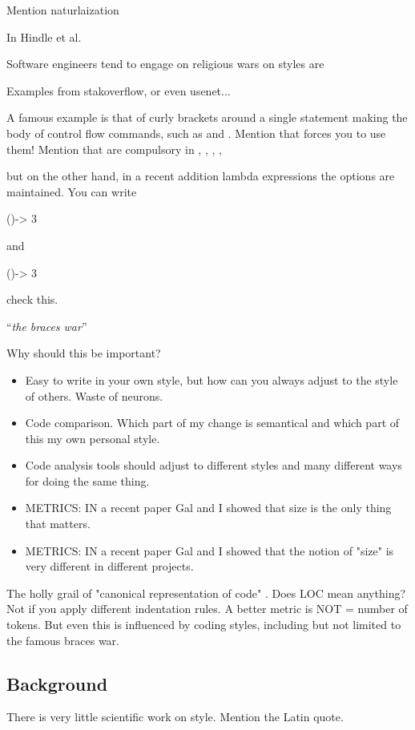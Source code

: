 Mention naturlaization

In Hindle et al. \cite{Hindle:Bar:Su:Gabel:Devanbu:2012}

\Java
Software engineers tend to engage  on religious wars on styles are

Examples from stakoverflow, or even usenet... 

A famous example is that of curly brackets around a single statement making
the body of control flow commands, such as  and 
.
Mention that \Go forces you to use them!
Mention that are compulsory in , 
,  
,  
,  

but on the other hand, in a recent addition lambda expressions\cite{lambda}
the options are maintained.
You can write
\begin{JAVA}
()-> 3
\end{JAVA}
and
\begin{JAVA}
  ()-> {3}
\end{JAVA}
check this.

``\emph{the braces war}''


Why should this be important?
\begin{itemize}
    \item Easy to write in  your own style, but how can 
      you always adjust to the style of others.
      Waste of neurons.
    \item Code comparison. Which part of my change is semantical and which 
      part of this my own personal style.
    \item Code analysis tools should adjust to different styles and many
        different ways for doing the same thing.
    \item METRICS: IN a recent paper Gal and I showed that size 
      is the only thing that matters.
    \item METRICS: IN a recent paper Gal and I showed that the notion of 
      "size" is very different in different projects.
\end{itemize}

The holly grail of "canonical representation of code" .
Does LOC mean anything?
Not if you apply different indentation rules.
A better metric is NOT = number of tokens.
But even this is influenced by coding styles, including but 
not limited to the famous braces war.


\subsection{Background}
There is very little scientific work on style.
Mention the Latin quote.

